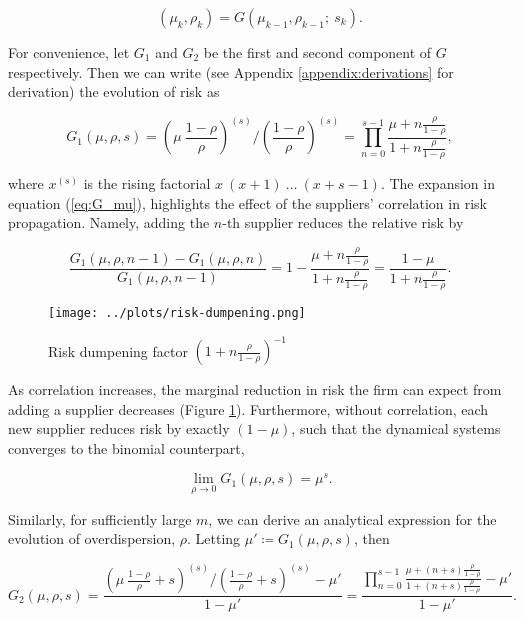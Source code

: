 \documentclass[american, abstract=on]{scrartcl}
\theoremstyle{plain}
\begin{document}
\begin{equation}
  (\mu_k, \rho_k) = G(\mu_{k - 1}, \rho_{k - 1}; \ s_k).
\end{equation}

For convenience, let $G_1$ and $G_2$ be the first and second component of $G$ respectively. Then we can write (see Appendix \ref{appendix:derivations} for derivation) the evolution of risk as

\begin{equation} \label{eq:G_mu}
  G_1(\mu, \rho, s) = \left( \mu \  \frac{1 - \rho}{\rho} \right)^{(s)} \Big/ \left(\frac{1 - \rho}{\rho} \right)^{(s)} = \prod^{s - 1}_{n = 0} \frac{\mu + n \frac{\rho}{1 - \rho}}{1 + n \frac{\rho}{1 - \rho}},
\end{equation}

where $x^{(s)}$ is the rising factorial $x \ (x + 1) \ \ldots \ (x + s - 1)$. The expansion in equation (\ref{eq:G_mu}), highlights the effect of the suppliers' correlation in risk propagation. Namely, adding the $n$-th supplier reduces the relative risk by

\begin{equation}
  \frac{G_1(\mu, \rho, n - 1) - G_1(\mu, \rho, n)}{G_1(\mu, \rho, n - 1)} = 1 - \frac{\mu + n \frac{\rho}{1 - \rho}}{1 + n \frac{\rho}{1 - \rho}} = \frac{1 - \mu}{1 + n \frac{\rho}{1 - \rho}}.
\end{equation}

\begin{figure}[H]
  \centering
  \texttt{[image: ../plots/risk-dumpening.png]}
  \caption{Risk dumpening factor $\left(1 + n \frac{\rho}{1 - \rho}\right)^{-1}$}
  \label{fig:risk-dumpening}
\end{figure}

As correlation increases, the marginal reduction in risk the firm can expect from adding a supplier decreases (Figure \ref{fig:risk-dumpening}). Furthermore, without correlation, each new supplier reduces risk by exactly $(1-\mu)$, such that the dynamical systems converges to the binomial counterpart,

\begin{equation}
  \lim_{\rho \rightarrow 0} G_1(\mu, \rho, s) = \mu^s.
\end{equation}

Similarly, for sufficiently large $m$, we can derive an analytical expression for the evolution of overdispersion, $\rho$. Letting $\mu' \coloneqq G_1(\mu, \rho, s)$, then

\begin{equation}
  G_2(\mu, \rho, s) = \frac{\left( \mu \  \frac{1 - \rho}{\rho} + s \right)^{(s)} \Big/ \left( \frac{1 - \rho}{\rho} + s \right)^{(s)} - \mu'}{1 - \mu'} = \frac{\prod^{s - 1}_{n = 0} \frac{\mu + (n + s) \frac{\rho}{1 - \rho}}{1 + (n + s) \frac{\rho}{1 - \rho}} - \mu'}{1 - \mu'}.
\end{equation}
\end{document}
